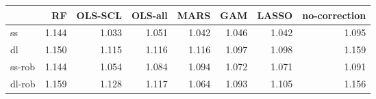 \begin{tabular}{lrrrrrrr}
\toprule
 & RF & OLS-SCL & OLS-all & MARS & GAM & LASSO & no-correction \\
\midrule
ss & {\cellcolor[HTML]{000000}} \color[HTML]{F1F1F1} 1.144 & {\cellcolor[HTML]{F1F1F1}} \color[HTML]{000000} 1.033 & {\cellcolor[HTML]{CACACA}} \color[HTML]{000000} 1.051 & {\cellcolor[HTML]{DDDDDD}} \color[HTML]{000000} 1.042 & {\cellcolor[HTML]{D4D4D4}} \color[HTML]{000000} 1.046 & {\cellcolor[HTML]{DDDDDD}} \color[HTML]{000000} 1.042 & {\cellcolor[HTML]{6A6A6A}} \color[HTML]{F1F1F1} 1.095 \\
dl & {\cellcolor[HTML]{222222}} \color[HTML]{F1F1F1} 1.150 & {\cellcolor[HTML]{ADADAD}} \color[HTML]{000000} 1.115 & {\cellcolor[HTML]{A7A7A7}} \color[HTML]{F1F1F1} 1.116 & {\cellcolor[HTML]{A7A7A7}} \color[HTML]{F1F1F1} 1.116 & {\cellcolor[HTML]{F1F1F1}} \color[HTML]{000000} 1.097 & {\cellcolor[HTML]{EDEDED}} \color[HTML]{000000} 1.098 & {\cellcolor[HTML]{000000}} \color[HTML]{F1F1F1} 1.159 \\
ss-rob & {\cellcolor[HTML]{000000}} \color[HTML]{F1F1F1} 1.144 & {\cellcolor[HTML]{F1F1F1}} \color[HTML]{000000} 1.054 & {\cellcolor[HTML]{A2A2A2}} \color[HTML]{F1F1F1} 1.084 & {\cellcolor[HTML]{878787}} \color[HTML]{F1F1F1} 1.094 & {\cellcolor[HTML]{C3C3C3}} \color[HTML]{000000} 1.072 & {\cellcolor[HTML]{C5C5C5}} \color[HTML]{000000} 1.071 & {\cellcolor[HTML]{8F8F8F}} \color[HTML]{F1F1F1} 1.091 \\
dl-rob & {\cellcolor[HTML]{000000}} \color[HTML]{F1F1F1} 1.159 & {\cellcolor[HTML]{4E4E4E}} \color[HTML]{F1F1F1} 1.128 & {\cellcolor[HTML]{696969}} \color[HTML]{F1F1F1} 1.117 & {\cellcolor[HTML]{F1F1F1}} \color[HTML]{000000} 1.064 & {\cellcolor[HTML]{A8A8A8}} \color[HTML]{F1F1F1} 1.093 & {\cellcolor[HTML]{888888}} \color[HTML]{F1F1F1} 1.105 & {\cellcolor[HTML]{060606}} \color[HTML]{F1F1F1} 1.156 \\
\bottomrule
\end{tabular}
